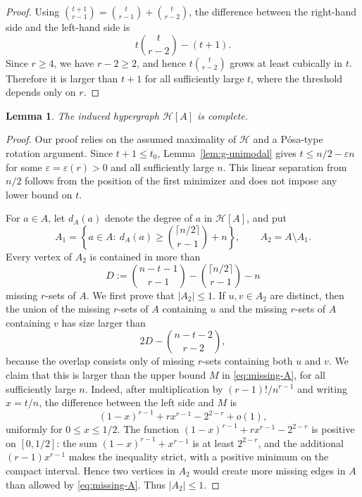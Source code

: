 \documentclass[12pt]{article}
\newtheorem{lemma}[theorem]{Lemma}
\newcommand{\Hcal}{\mathcal H}
\begin{document}
\begin{proof}
Using $\binom{t+1}{r-1}=\binom{t}{r-1}+\binom{t}{r-2}$, the difference
between the right-hand side and the left-hand side is
$$
        t\binom{t}{r-2}-(t+1).
$$
Since $r\ge4$, we have $r-2\ge2$, and hence
$t\binom{t}{r-2}$ grows at least cubically in $t$.  Therefore it is
larger than $t+1$ for all sufficiently large $t$, where the threshold
depends only on $r$.
\end{proof}

\begin{lemma}\label{lem:A-complete}
The induced hypergraph $\Hcal[A]$ is complete.
\end{lemma}

\begin{proof}
Our proof relies on the assumed maximality of $\Hcal$ and a P\'osa-type rotation argument.
Since
$t+1\le t_0$, Lemma~\ref{lem:g-unimodal} gives
$t\le n/2-\varepsilon n$ for some $\varepsilon=\varepsilon(r)>0$ and all
sufficiently large $n$.  This linear separation from $n/2$ follows from
the position of the first minimizer and does not impose any lower bound on
$t$.

For $a\in A$, let $d_A(a)$ denote the degree of $a$ in $\Hcal[A]$, and
put
$$
 A_1=\left\{a\in A:\ d_A(a)\ge
        \binom{\lceil n/2\rceil}{r-1}+n\right\},
        \qquad
 A_2=A\setminus A_1.
$$
Every vertex of $A_2$ is contained in more than
$$
        D:=\binom{n-t-1}{r-1}
        -\binom{\lceil n/2\rceil}{r-1}-n
$$
missing $r$-sets of $A$.  We first prove that $|A_2|\le 1$.  If
$u,v\in A_2$ are distinct, then the union of the missing $r$-sets of
$A$ containing $u$ and the missing $r$-sets of $A$ containing $v$ has size
larger than
$$
        2D-\binom{n-t-2}{r-2},
$$
because the overlap consists only of missing $r$-sets containing both
$u$ and $v$.  We claim that this is larger than the upper bound $M$ in
\eqref{eq:missing-A}, for all sufficiently large $n$.  Indeed, after
multiplication by $(r-1)!/n^{r-1}$ and writing $x=t/n$, the difference
between the left side and $M$ is
$$
        (1-x)^{r-1}+r x^{r-1}-2^{2-r}+o(1),
$$
uniformly for $0\le x\le 1/2$.  The function
$(1-x)^{r-1}+r x^{r-1}-2^{2-r}$ is positive on $[0,1/2]$: the sum
$(1-x)^{r-1}+x^{r-1}$ is at least $2^{2-r}$, and the additional
$(r-1)x^{r-1}$ makes the inequality strict, with a positive minimum on
the compact interval.  Hence two vertices in $A_2$ would create more
missing edges in $A$ than allowed by \eqref{eq:missing-A}.  Thus
$|A_2|\le1$.


\end{proof}
\end{document}
